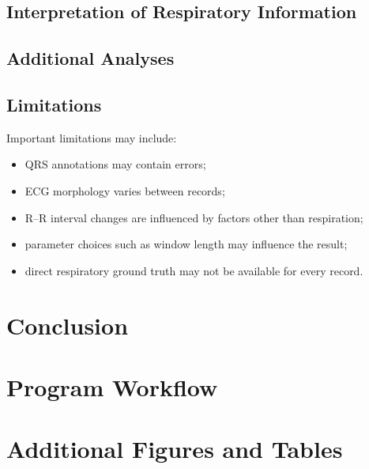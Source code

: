 \documentclass[a4paper,10.5pt,oneside]{report}
\begin{document}
\section{Interpretation of Respiratory Information}


\section{Additional Analyses}


\section{Limitations}

Important limitations may include:

\begin{itemize}
    \item QRS annotations may contain errors;
    \item ECG morphology varies between records;
    \item R--R interval changes are influenced by factors other than respiration;
    \item parameter choices such as window length may influence the result;
    \item direct respiratory ground truth may not be available for every record.
\end{itemize}

\chapter{Conclusion}


\begin{appendices}

\chapter{Program Workflow}


\chapter{Additional Figures and Tables}


\end{appendices}
\end{document}

